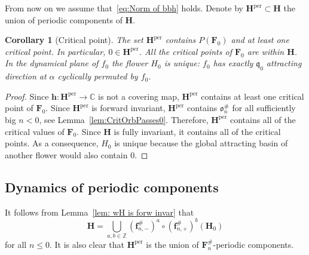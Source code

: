 \documentclass[]{amsart}
\newcommand{\bF}{{\mathbf F}}
\newcommand{\bH}{{\mathbf H}}
\newcommand{\bbf}{{\mathbf f}}
\newcommand{\bbh}{{\mathbf h}}
\renewcommand{\qq}{\mathfrak{q}}
\newcommand\crt{{\mathfrak o}}
\newcommand{\C}{\mathbb{C}}
\newcommand{\Z}{\mathbb{Z}}
\newtheorem{cor}[thm]{Corollary}
\theoremstyle{remark}
\numberwithin{equation}{section}
\theoremstyle{definition}
\newcommand{\per}{{\mathrm{per}}}
\begin{document}
From now on we assume that~\eqref{eq:Norm of bbh} holds. Denote by $\bH^\per\subset \bH$ the union of periodic components of $\bH$.

 
 \begin{cor}[Critical point]
 \label{cor:wHp:has:0}
 The set $ \bH^\per$ contains $P(\bF_0)$ and at least one critical point. In particular, $0\in  \bH^\per$. All the critical points of $\bF_0$ are within $\bH$. In the dynamical plane of $f_0$ the flower $H_0$ is unique: $f_0$ has exactly $\qq_0$ attracting direction at $\alpha$ cyclically permuted by $f_0$.
 \end{cor}
\begin{proof}
Since $ \bbh\colon \bH^\per\to \C$ is not a covering map, $ \bH^\per$ contains at least one critical point of $\bF_0$. Since $ \bH^\per$ is forward invariant, $ \bH^\per$ contains $\crt_{n}^{\#}$ for all sufficiently big $n<0$, see Lemma~\ref{lem:CritOrbPasses0}. Therefore, $ \bH^\per$ contains all of the critical values of $\bF_0$. Since $\bH$ is fully invariant, it contains all of the critical points. As a consequence, $H_0$ is unique because the global attracting basin of another flower would also contain $0$.
\end{proof} 


\subsection{Dynamics of periodic components}
\label{ss:Enumer of bH}
It follows from Lemma~\ref{lem: wH is forw invar} that 
\[\bH= \bigcup_{a,b\in \Z} (\bbf^{\#}_{n,-})^a\circ (\bbf^{\#}_{n,+})^{b} \left(\bH_{{0}} \right)\]
 for all $n\le 0$. It is also clear that $\bH^\per$ is the union of $\bF_n^{\#}$-periodic components.
\end{document}

